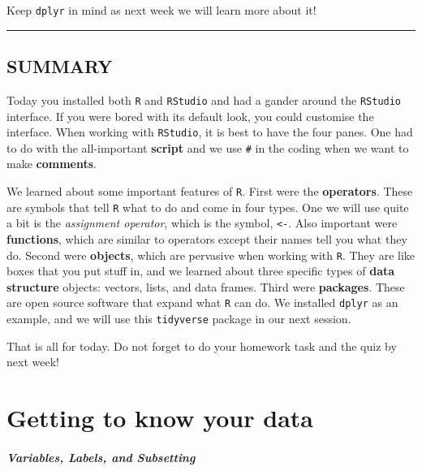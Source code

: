 \documentclass[
]{book}
\begin{document}
Keep \texttt{dplyr} in mind as next week we will learn more about it!

\begin{center}\rule{0.5\linewidth}{0.5pt}\end{center}

\hypertarget{summary}{%
\section{SUMMARY}\label{summary}}

Today you installed both \texttt{R} and \texttt{RStudio} and had a gander around the \texttt{RStudio} interface. If you were bored with its default look, you could customise the interface. When working with \texttt{RStudio}, it is best to have the four panes. One had to do with the all-important \textbf{script} and we use \texttt{\#} in the coding when we want to make \textbf{comments}.

We learned about some important features of \texttt{R}. First were the \textbf{operators}. These are symbols that tell \texttt{R} what to do and come in four types. One we will use quite a bit is the \emph{assignment operator}, which is the symbol, \texttt{\textless{}-}. Also important were \textbf{functions}, which are similar to operators except their names tell you what they do. Second were \textbf{objects}, which are pervasive when working with \texttt{R}. They are like boxes that you put stuff in, and we learned about three specific types of \textbf{data structure} objects: vectors, lists, and data frames. Third were \textbf{packages}. These are open source software that expand what \texttt{R} can do. We installed \texttt{dplyr} as an example, and we will use this \texttt{tidyverse} package in our next session.

That is all for today. Do not forget to do your homework task and the quiz by next week!

\hypertarget{getting-to-know-your-data}{%
\chapter{Getting to know your data}\label{getting-to-know-your-data}}

\hypertarget{variables-labels-and-subsetting}{%
\subsubsection*{\texorpdfstring{\emph{Variables, Labels, and Subsetting}}{Variables, Labels, and Subsetting}}\label{variables-labels-and-subsetting}}
\end{document}
